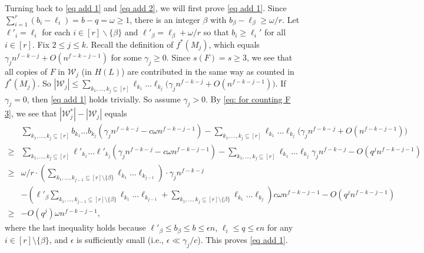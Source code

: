 \documentclass[10pt]{article}
\begin{document}
Turning back to \eqref{eq add 1} and \eqref{eq add 2}, we will first prove \eqref{eq add 1}.
Since $\sum_{i=1}^{r}(b_i-\ell_i)=b-q=\omega\geq 1$, there is an integer $\beta$ with $b_{\beta}-\ell_{\beta}\geq \omega/r$.
Let $\ell'_i=\ell_i$ for each $i\in [r]\backslash \{\beta\}$ and $\ell'_\beta=\ell_\beta+\omega/r$ so that $b_i\geq \ell_i'$ for all $i\in [r]$.
Fix $2\leq j\leq k$.
Recall the definition of $f^\ast(M_j)$, which equals $\gamma_j n^{f-k-j}+O(n^{f-k-j-1})$ for some $\gamma_j\geq 0$.
Since $s(F)=s\geq 3$, we see that all copies of $F$ in $\mathcal{W}_j$ (in $H(L)$) are contributed in the same way as counted in $f^\ast(M_j)$.
So $|\mathcal{W}_j|\leq \sum_{k_1,\ldots,k_j\subseteq  [r]} \ell_{k_1}\ldots \ell_{k_{j}}\big(\gamma_j n^{f-k-j}+O(n^{f-k-j-1})\big)$.
If $\gamma_j=0$, then \eqref{eq add 1} holds trivially.
So assume $\gamma_j>0$.
By \eqref{eq: for counting F 3}, we see that $|\mathcal{W}^\ast_j|-|\mathcal{W}_j|$ equals
\begin{align*}
&\sum_{k_1,\ldots,k_j\subseteq  [r]} b_{k_1}\ldots b_{k_{j}}\left(\gamma_j n^{f-k-j}-c \omega n^{f-k-j-1}\right)-\sum_{k_1,\ldots,k_j\subseteq  [r]} \ell_{k_1}\ldots \ell_{k_j}\big(\gamma_j n^{f-k-j}+O(n^{f-k-j-1})\big)\\
\geq &\sum_{k_1,\ldots,k_j\subseteq  [r]} \ell'_{k_1}\ldots \ell'_{k_{j}}\left(\gamma_j n^{f-k-j}-c \omega n^{f-k-j-1}\right)-\sum_{k_1,\ldots,k_j\subseteq  [r]} \ell_{k_1}\ldots \ell_{k_{j}}\gamma_j n^{f-k-j}-O(q^jn^{f-k-j-1})\\
\geq &\omega/r\cdot \left(\sum_{k_1,\ldots,k_{j-1}\subseteq [r]\setminus \{\beta\}}\ell_{k_1}\ldots \ell_{k_{j-1}}\right)\cdot \gamma_j n^{f-k -j}\\
&-\left(\ell'_\beta\sum_{k_1,\ldots,k_{j-1}\subseteq  [r]\setminus \{\beta\}} \ell_{k_1}\ldots \ell_{k_{j-1}}+\sum_{k_1,\ldots,k_j\subseteq  [r]\setminus \{\beta\}} \ell_{k_1}\ldots \ell_{k_{j}}\right)c \omega n^{f-k-j-1}-O(q^jn^{f-k-j-1})\\
\geq &- O(q^j)\omega n^{f-k-j-1},
\end{align*}
where the last inequality holds because $\ell'_\beta\leq b_\beta\leq b\leq \epsilon n$, $\ell_i\leq q\leq \epsilon n$ for any $i\in [r]\setminus \{\beta\}$, and $\epsilon$ is sufficiently small (i.e., $\epsilon\ll \gamma_j/c$).
This proves \eqref{eq add 1}.
\end{document}
